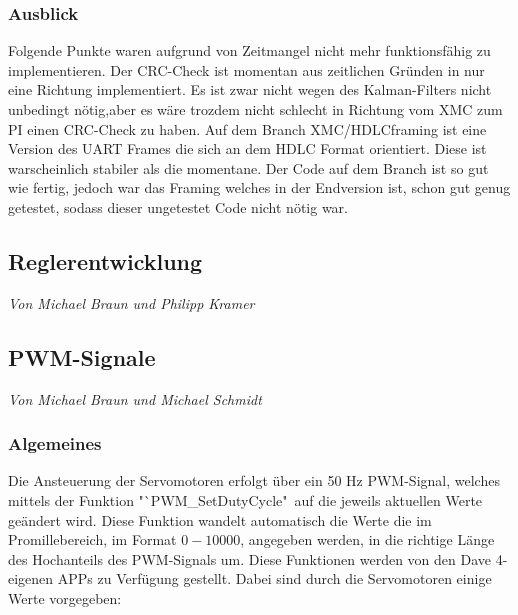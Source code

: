 \documentclass[12pt,a4paper,bibliography=totoc,listof=totoc]{scrartcl}
\begin{document}
\subsubsection{Ausblick}
Folgende Punkte waren aufgrund von Zeitmangel nicht mehr funktionsfähig zu implementieren.
Der CRC-Check ist momentan aus zeitlichen Gründen in nur eine Richtung implementiert. Es ist zwar nicht wegen des Kalman-Filters nicht unbedingt nötig,aber
 es wäre trozdem nicht schlecht in Richtung vom XMC zum PI einen CRC-Check zu haben. 
Auf dem Branch XMC/HDLCframing ist eine Version des UART Frames die sich an dem HDLC Format orientiert. Diese 
ist warscheinlich stabiler als die momentane. Der Code auf dem Branch ist so gut wie fertig, jedoch war das Framing welches 
in der Endversion ist, schon gut genug getestet, sodass dieser ungetestet Code nicht nötig war.
\subsection{Reglerentwicklung}
\textit{Von Michael Braun und Philipp Kramer}\newline

\subsection{PWM-Signale}
\textit{Von Michael Braun und Michael Schmidt}\newline
\subsubsection{ Algemeines}
Die Ansteuerung der Servomotoren erfolgt über ein 50 Hz PWM-Signal, welches mittels der Funktion 
"`PWM\_SetDutyCycle"\, auf die jeweils aktuellen Werte geändert wird. Diese Funktion wandelt automatisch 
die Werte die im Promillebereich, im Format $0-10000$, angegeben werden, in die richtige Länge des 
Hochanteils des PWM-Signals um. Diese Funktionen werden von den Dave 4- eigenen APPs zu Verfügung 
gestellt. Dabei sind durch die Servomotoren einige Werte vorgegeben:
\end{document}

